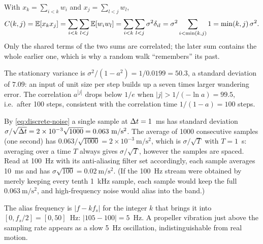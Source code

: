 \begin{solutions}
  \item With $x_k = \sum_{i<k}w_i$ and $x_j = \sum_{l<j}w_l$,
        \[
          C(k, j) = \mathbb{E}[x_kx_j] = \sum_{i<k}\sum_{l<j}\mathbb{E}[w_iw_l] = \sum_{i<k}\sum_{l<j}\sigma^2\delta_{il} = \sigma^2\sum_{i<\min(k, j)}1 = \min(k, j)\,\sigma^2 .
        \]
        Only the shared terms of the two sums are correlated; the later sum contains the whole earlier one, which is why a random walk
        ``remembers'' its past.

  \item The stationary variance is $\sigma^2/(1 - a^2) = 1/0.0199 = 50.3$, a standard deviation of $7.09$: an input of unit size per step builds up a
        seven times larger wandering error. The correlation $a^{|j|}$ drops below $1/e$ when $|j| > 1/(-\ln a) = 99.5$, i.e.\ after 100 steps,
        consistent with the correlation time $1/(1 - a) = 100$ steps.

  \item By \eqref{eq:discrete-noise} a single sample at ${\Delta t} = 1$~ms has standard deviation $\sigma/\sqrt{{\Delta t}} = 2\times10^{-3}\sqrt{1000} = 0.063~\mathrm{m/s^2}$.
        The average of 1000 consecutive samples (one second) has $0.063/\sqrt{1000} = 2\times10^{-3}~\mathrm{m/s^2}$, which is $\sigma/\sqrt T$ with $T = 1$~s:
        averaging over a time $T$ always gives $\sigma/\sqrt T$, however the samples are spaced. Read at 100~Hz with its anti-aliasing filter set
        accordingly, each sample averages 10~ms and has $\sigma\sqrt{100} = 0.02~\mathrm{m/s^2}$. (If the 100~Hz stream were obtained by merely keeping
        every tenth 1~kHz sample, each sample would keep the full $0.063~\mathrm{m/s^2}$, and high-frequency noise would alias into the band.)

  \item The alias frequency is $|f - kf_s|$ for the integer $k$ that brings it into $[0, f_s/2] = [0, 50]$~Hz: $|105 - 100| = 5$~Hz. A propeller
        vibration just above the sampling rate appears as a slow 5~Hz oscillation, indistinguishable from real motion.


\end{solutions}
